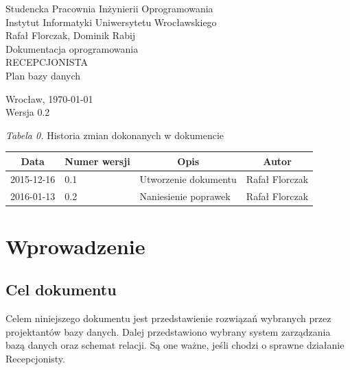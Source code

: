 \documentclass [11pt, a4paper, leqno] {article}
\begin{document}

\begin{center}
  \thispagestyle{empty} %
  {\large Studencka Pracownia Inżynierii Oprogramowania} \\ [0.5cm]
	{\large Instytut Informatyki Uniwersytetu Wrocławskiego} \\ [6.0cm]

  {\large Rafał Florczak, Dominik Rabij} \\ [1.5cm]

	{\huge Dokumentacja oprogramowania} \\ [0.5cm]
  {\huge RECEPCJONISTA} \\ [1.5cm]

  {\large Plan bazy danych} \\ [0.5cm]

  \vfill
  
  {\large Wrocław, \today} \\ [0.5cm]

  {\large Wersja 0.2}
\end{center}

\newpage


\textit{Tabela 0.} Historia zmian dokonanych w dokumencie

\begin{center}
  \begin{tabular}{| l | l | l | l |}
    \hline
    \multicolumn{1}{|c|}{Data} & 
    \multicolumn{1}{|c|}{Numer wersji} &  
    \multicolumn{1}{|c|}{Opis} &
    \multicolumn{1}{|c|}{Autor} \\ \hline \hline
    2015-12-16 & 0.1 & Utworzenie dokumentu & Rafał Florczak \\ \hline
    2016-01-13 & 0.2 & Naniesienie poprawek & Rafał Florczak \\ \hline
  \end{tabular}
\end{center}

\medskip

\tableofcontents

\newpage

\section{Wprowadzenie}

\subsection{Cel dokumentu}
\noindent
Celem niniejszego dokumentu jest przedstawienie rozwiązań wybranych przez projektantów bazy danych. Dalej przedstawiono wybrany system zarządzania bazą danych oraz schemat relacji. Są one ważne, jeśli chodzi o sprawne działanie Recepcjonisty.
\end{document}
